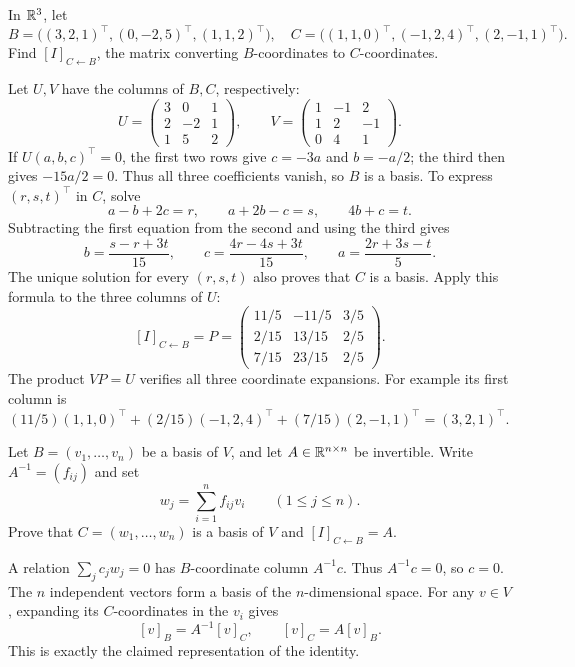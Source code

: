 \begin{problem}\label{ex:04:change-coordinates}
In \(\mathbb R^3\), let
\[
B=\bigl((3,2,1)^\top,(0,-2,5)^\top,(1,1,2)^\top\bigr),
\quad
C=\bigl((1,1,0)^\top,(-1,2,4)^\top,(2,-1,1)^\top\bigr).
\]
Find \([I]_{C\leftarrow B}\), the matrix converting \(B\)-coordinates
to \(C\)-coordinates.
\end{problem}
\begin{solution}
Let \(U,V\) have the columns of \(B,C\), respectively:
\[
U=\begin{pmatrix}3&0&1\\2&-2&1\\1&5&2\end{pmatrix},\qquad
V=\begin{pmatrix}1&-1&2\\1&2&-1\\0&4&1\end{pmatrix}.
\]
If \(U(a,b,c)^\top=0\), the first two rows give \(c=-3a\) and \(b=-a/2\);
the third then gives \(-15a/2=0\). Thus all three coefficients vanish,
so \(B\) is a basis.
To express \((r,s,t)^\top\) in \(C\), solve
\[
a-b+2c=r,\qquad a+2b-c=s,\qquad4b+c=t.
\]
Subtracting the first equation from the second and using the third gives
\[
b=\frac{s-r+3t}{15},\qquad
c=\frac{4r-4s+3t}{15},\qquad
a=\frac{2r+3s-t}{5}.
\]
The unique solution for every \((r,s,t)\) also proves that \(C\) is a basis.
Apply this formula to the three columns of \(U\):
\[
[I]_{C\leftarrow B}
=P=\begin{pmatrix}
11/5&-11/5&3/5\\
2/15&13/15&2/5\\
7/15&23/15&2/5
\end{pmatrix}.
\]
The product \(VP=U\) verifies all three coordinate expansions.
For example its first column is
\((11/5)(1,1,0)^\top+(2/15)(-1,2,4)^\top
+(7/15)(2,-1,1)^\top=(3,2,1)^\top\).
\end{solution}

\begin{problem}\label{ex:04:prescribed-change}
Let \(B=(v_1,\ldots,v_n)\) be a basis of \(V\), and let
\(A\in\mathbb R^{n\times n}\) be invertible. Write \(A^{-1}=(f_{ij})\) and set
\[
w_j=\sum_{i=1}^n f_{ij}v_i\qquad(1\leqslant j\leqslant n).
\]
Prove that \(C=(w_1,\ldots,w_n)\) is a basis of \(V\) and
\([I]_{C\leftarrow B}=A\).
\end{problem}
\begin{solution}
A relation \(\sum_j c_jw_j=0\) has \(B\)-coordinate column \(A^{-1}c\).
Thus \(A^{-1}c=0\), so \(c=0\).
The \(n\) independent vectors form a basis of the \(n\)-dimensional space.
For any \(v\in V\), expanding its \(C\)-coordinates in the \(v_i\) gives
\[
[v]_B=A^{-1}[v]_C,\qquad [v]_C=A[v]_B.
\]
This is exactly the claimed representation of the identity.
\end{solution}

